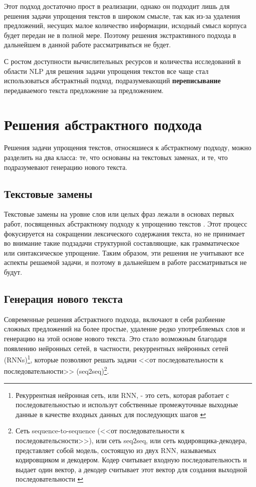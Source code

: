 Этот подход достаточно прост в реализации, однако он подходит лишь для решения задачи упрощения текстов в широком смысле, так как из-за удаления предложений, несущих малое количество информации, исходный смысл корпуса будет передан не в полной мере. Поэтому решения экстрактивного подхода в дальнейшем в данной работе рассматриваться не будет.

С ростом доступности вычислительных ресурсов и количества исследований в области NLP для решения задачи упрощения текстов все чаще стал использоваться абстрактный подход, подразумевающий \textbf{переписывание} передаваемого текста предложение за предложением\cite{see_get_2017}. 

\section{Решения абстрактного подхода}

Решения задачи упрощения текстов, относяшиеся к абстрактному подходу, можно разделить на два класса: те, что основаны на текстовых заменах, и те, что подразумевают генерацию нового текста.

\subsection{Текстовые замены}

Текстовые замены на уровне слов или целых фраз лежали в основах первых работ, посвященных абстрактному подходу к упрощению текстов \cite{paetzold_survey_2017}. Этот процесс фокусируется на сокращении лексического содержания текста, но не принимает во внимание такие подзадачи структурной составляющие, как грамматическое или синтаксическое упрощение\cite{shardlow_survey_2014}. Таким образом, эти решения не учитывают все аспекты решаемой задачи, и поэтому в дальнейшем в работе рассматриваться не будут.

\subsection{Генерация нового текста}
Современные решения абстрактного подхода,  включают в себя разбиение сложных предложений на более простые, удаление редко употребляемых слов и генерацию на этой основе нового текста. Это стало возможным благодаря появлению нейронных сетей, в частности, рекуррентных нейронных сетей (RNNs)\footnote{Рекуррентная нейронная сеть, или RNN, - это сеть, которая работает с последовательностью и использут собственные промежуточные выходные данные в качестве входных данных для последующих шагов \cite{noauthor_nlp_nodate}}, которые позволяют решать задачи <<от последовательности к последовательности>> (seq2seq)\footnote{Сеть sequence-to-sequence (<<от последовательности к последовательсности>>), или сеть seq2seq, или сеть кодировщика-декодера, представляет собой модель, состоящую из двух RNN, называемых кодировщиком и декодером. Кодер считывает входную последовательность и выдает один вектор, а декодер считывает этот вектор для создания выходной последовательности \cite{noauthor_nlp_nodate}}.

